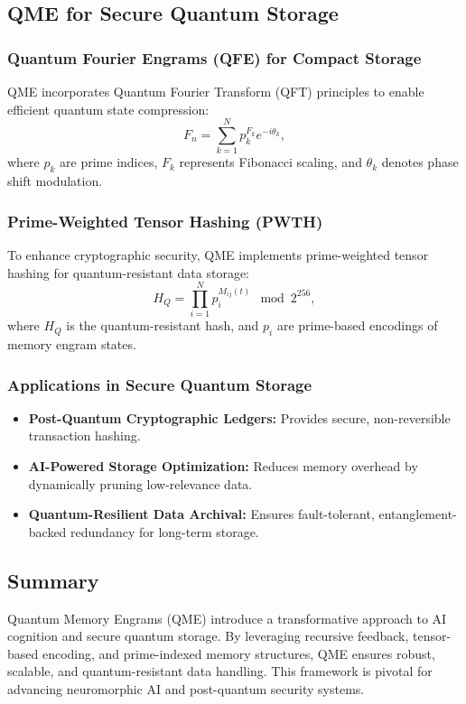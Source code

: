 \documentclass{article}
\theoremstyle{plain}
\begin{document}
\begin{itemize}
\begin{itemize}
\subsection{QME for Secure Quantum Storage}
\subsubsection{Quantum Fourier Engrams (QFE) for Compact Storage}
QME incorporates Quantum Fourier Transform (QFT) principles to enable efficient quantum state compression:
\begin{equation}
F_n = \sum_{k=1}^{N} p_k^{F_k} e^{-i\theta_k},
\end{equation}
where $p_k$ are prime indices, $F_k$ represents Fibonacci scaling, and $\theta_k$ denotes phase shift modulation.

\subsubsection{Prime-Weighted Tensor Hashing (PWTH)}
To enhance cryptographic security, QME implements prime-weighted tensor hashing for quantum-resistant data storage:
\begin{equation}
H_Q = \prod_{i=1}^{N} p_i^{M_{ij}(t)} \mod 2^{256},
\end{equation}
where $H_Q$ is the quantum-resistant hash, and $p_i$ are prime-based encodings of memory engram states.

\subsubsection{Applications in Secure Quantum Storage}
\begin{itemize}
    \item \textbf{Post-Quantum Cryptographic Ledgers:} Provides secure, non-reversible transaction hashing.
    \item \textbf{AI-Powered Storage Optimization:} Reduces memory overhead by dynamically pruning low-relevance data.
    \item \textbf{Quantum-Resilient Data Archival:} Ensures fault-tolerant, entanglement-backed redundancy for long-term storage.
\end{itemize}

\subsection{Summary}
Quantum Memory Engrams (QME) introduce a transformative approach to AI cognition and secure quantum storage. By leveraging recursive feedback, tensor-based encoding, and prime-indexed memory structures, QME ensures robust, scalable, and quantum-resistant data handling. This framework is pivotal for advancing neuromorphic AI and post-quantum security systems.



\end{itemize}
\end{itemize}
\end{document}
